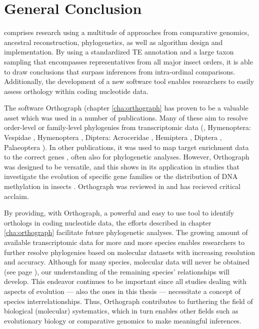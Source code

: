 \chapter{General Conclusion}
\label{conclusion}

 comprises research using a multitude of
approaches from comparative genomics, ancestral reconstruction,
phylogenetics, as well as algorithm design and implementation. By using
a standardized TE annotation and a large taxon sampling that encompasses
representatives from all major insect orders, it is able to draw
conclusions that surpass inferences from intra-ordinal comparisons.
Additionally, the development of a new software tool enables researchers
to easily assess orthology within coding nucleotide data.

The software Orthograph (chapter \ref{cha:orthograph} has proven to be a
valuable asset which was used in a number of publications. Many of these
aim to resolve order-level or family-level phylogenies from
transcriptomic data (\eg, Hymenoptera: Vespidae \citep{Bank2017},
Hymenoptera \citep{Peters2017}, Diptera: Acroceridae \citep{Gillung2018},
Hemiptera \citep{Johnson2018}, Diptera \citep{Kutty2018}, Palaeoptera
\citep{Simon2018}). In other publications, it was used to map target
enrichment data to the correct genes \citep{Mayer2016, Sann2018,
Shin2018}, often also for phylogenetic analyses. However, Orthograph was
designed to be versatile, and this shows in its application in studies
that investigate the evolution of specific gene families
\citep{Pauli2016, Dowling2017} or the distribution of DNA methylation in
insects \citep{Provataris2018}. Orthograph was reviewed in
\citet{Nichio2017} and has recieved critical acclaim.

By providing, with Orthograph, a powerful and easy to use tool to
identify orthologs in coding nucleotide data, the efforts described in
chapter \ref{cha:orthograph} facilitate future phylogenetic analyses.
The growing amount of available transcriptomic data for more and more
species enables researchers to further resolve phylogenies based on
molecular datasets with increasing resolution and accuracy. Although for
many species, molecular data will never be obtained (see page
\pageref{mass-extinction}), our understanding of the remaining species'
relationships will develop. This endeavor continues to be important
since all studies dealing with aspects of evolution --- also the ones in
this thesis --- necessitate a concept of species interrelationships.
Thus, Orthograph contributes to furthering the field of biological
(molecular) systematics, which in turn enables other fields such as
evolutionary biology or comparative genomics to make meaningful
inferences.

